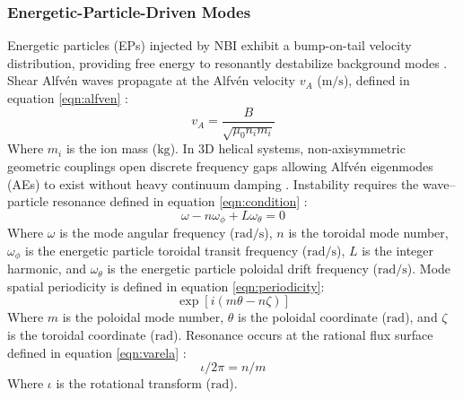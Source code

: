 \subsubsection{Energetic-Particle-Driven Modes}
Energetic particles (EPs) injected by NBI exhibit a bump-on-tail velocity distribution, providing free energy to resonantly destabilize background modes \cite{Sheikh2023, Adulsiriswad_2024, Varela2015}. Shear Alfv\'en waves propagate at the Alfv\'en velocity $v_A$ ($\text{m/s}$), defined in equation \ref{eqn:alfven} \cite{chen2016introduction}:
\begin{equation}
\label{eqn:alfven}
v_A = \frac{B}{\sqrt{\mu_0 n_i m_i}}
\end{equation}
Where $m_i$ is the ion mass ($\text{kg}$). In 3D helical systems, non-axisymmetric geometric couplings open discrete frequency gaps allowing Alfv\'en eigenmodes (AEs) to exist without heavy continuum damping \cite{Varela2015, Adulsiriswad_2024}. Instability requires the wave--particle resonance defined in equation \ref{eqn:condition} \cite{Adulsiriswad_2024}:
\begin{equation}
\label{eqn:condition}
\omega - n\omega_\phi + L\omega_\theta = 0
\end{equation}
Where $\omega$ is the mode angular frequency ($\text{rad/s}$), $n$ is the toroidal mode number, $\omega_\phi$ is the energetic particle toroidal transit frequency ($\text{rad/s}$), $L$ is the integer harmonic, and $\omega_\theta$ is the energetic particle poloidal drift frequency ($\text{rad/s}$). Mode spatial periodicity is defined in equation \ref{eqn:periodicity}:
\begin{equation}
\label{eqn:periodicity}    
\exp\left[i(m\theta - n\zeta)\right]
\end{equation}
Where $m$ is the poloidal mode number, $\theta$ is the poloidal coordinate ($\text{rad}$), and $\zeta$ is the toroidal coordinate ($\text{rad}$). Resonance occurs at the rational flux surface defined in equation \ref{eqn:varela} \cite{Varela2015}:
\begin{equation}
\label{eqn:varela}
    \iota/2\pi = n/m
\end{equation}
Where $\iota$ is the rotational transform ($\text{rad}$).

